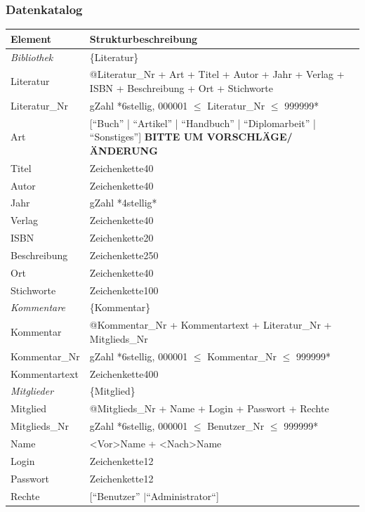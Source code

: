 \subsubsection{Datenkatalog}
\begin{longtable}{|l|p{8.5cm}|}
\hline
Element & Strukturbeschreibung \\
\hline\hline
\endhead

\emph{Bibliothek} & \{Literatur\} \\
\hline
Literatur & @Literatur\_Nr + Art + Titel + Autor + Jahr + Verlag + ISBN + Beschreibung + Ort + Stichworte \\
\hline
Literatur\_Nr & gZahl *6stellig, 000001 $\leq$ Literatur\_Nr $\leq$ 999999* \\
\hline
Art & [``Buch'' | ``Artikel'' | ``Handbuch'' | ``Diplomarbeit'' | ``Sonstiges''] \textbf{BITTE UM VORSCHLÄGE/ÄNDERUNG}\\
\hline
Titel & Zeichenkette40 \\
\hline
Autor & Zeichenkette40 \\
\hline
Jahr & gZahl *4stellig* \\
\hline
Verlag & Zeichenkette40 \\
\hline
ISBN & Zeichenkette20 \\
\hline
Beschreibung & Zeichenkette250 \\
\hline
Ort & Zeichenkette40 \\
\hline
Stichworte & Zeichenkette100 \\
\hline\hline

\emph{Kommentare} & \{Kommentar\} \\
\hline
Kommentar & @Kommentar\_Nr + Kommentartext + Literatur\_Nr + Mitglieds\_Nr\\
\hline
Kommentar\_Nr & gZahl *6stellig, 000001 $\leq$ Kommentar\_Nr $\leq$ 999999* \\
\hline
Kommentartext & Zeichenkette400 \\
\hline\hline

\emph{Mitglieder} & \{Mitglied\} \\
\hline
Mitglied  & @Mitglieds\_Nr  + Name + Login + Passwort + Rechte\\
\hline
Mitglieds\_Nr & gZahl *6stellig, 000001 $\leq$ Benutzer\_Nr $\leq$ 999999* \\ 
\hline
Name & <Vor>Name + <Nach>Name \\
\hline
Login & Zeichenkette12 \\
\hline
Passwort & Zeichenkette12 \\
\hline
Rechte & [``Benutzer'' $\mid $``Administrator``] \\
\hline\hline


\end{longtable}
